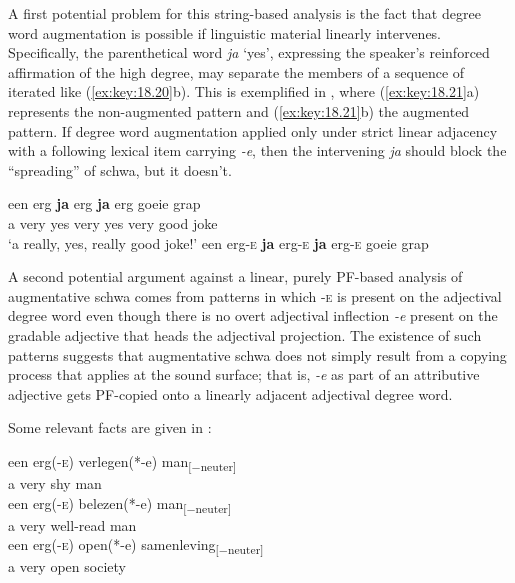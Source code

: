 \documentclass[output=paper]{langsci/langscibook}
\begin{document}
A first potential problem for this string-based analysis is the fact that
degree word augmentation is possible if linguistic material linearly
intervenes. Specifically, the parenthetical word \emph{ja} \enquote*{yes},
expressing the speaker's reinforced affirmation of the high degree, may
separate the members of a sequence of iterated  like
(\ref{ex:key:18.20}b). This is exemplified in , where
(\ref{ex:key:18.21}a) represents the non-augmented pattern and (\ref{ex:key:18.21}b) the
augmented pattern. If degree word augmentation applied only under strict linear
adjacency with a following lexical item carrying \emph{-e}, then the
intervening \emph{ja} should block the \enquote{spreading} of schwa, but it
doesn't.

\ea%
    \label{ex:key:18.21}
	\ea
	\gll een  erg   \textbf{ja}      erg      \textbf{ja}      erg      goeie    grap\\
		a        very    yes    very    yes    very    good    joke\\
	\glt \enquote*{a really, yes, really good joke!}
	\ex een erg-\textsc{e} \textbf{ja} erg-\textsc{e} \textbf{ja} erg\textsc{-e} goeie grap
	\z
\z

A second potential argument against a linear, purely \gls{PF}-based analysis of
augmentative schwa comes from patterns in which \textsc{-e} is present on the
adjectival degree word even though there is no overt adjectival inflection
\emph{-e} present on the gradable adjective that heads the adjectival
projection. The existence of such patterns suggests that augmentative schwa
does not simply result from a copying process that applies at the sound
surface; that is, \emph{-e} as part of an attributive adjective gets \gls{PF}-copied
onto a linearly adjacent adjectival degree word.

Some relevant facts are given in :

\ea%
    \label{ex:key:18.22}
	\ea
	\gll een  erg(-\textsc{e})    verlegen(*-e)  man\textsubscript{[−neuter]}\\
		a        very        shy                    man\\
	\ex
	\gll   een    erg(-\textsc{e})    belezen(*-e)    man\textsubscript{[−neuter]}\\
		 a        very        well-read        man\\
	\ex
	\gll  een  erg(-\textsc{e})    open(*-e)    samenleving\textsubscript{[−neuter]}\\
		 a        very        open            society\\
	\z
\z
\end{document}
